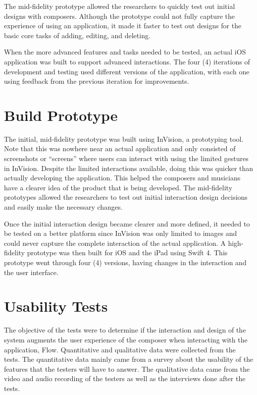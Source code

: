 		The mid-fidelity prototype allowed the researchers to quickly test out initial designs with composers. Although the prototype could not fully capture the experience of using an application, it made it faster to test out designs for the basic core tasks of adding, editing, and deleting. 

		When the more advanced features and tasks needed to be tested, an actual iOS application was built to support advanced interactions. The four (4) iterations of development and testing used different versions of the application, with each one using feedback from the previous iteration for improvements. 

	\section{Build Prototype}

		The initial, mid-fidelity prototype was built using InVision, a prototyping tool. Note that this was nowhere near an actual application and only consisted of screenshots or ``screens'' where users can interact with using the limited gestures in InVision. Despite the limited interactions available, doing this was quicker than actually developing the application. This helped the composers and musicians have a clearer idea of the product that is being developed. The mid-fidelity prototypes allowed the researchers to test out initial interaction design decisions and easily make the necessary changes. 

		Once the initial interaction design became clearer and more defined, it needed to be tested on a better platform since InVision was only limited to images and could never capture the complete interaction of the actual application. A high-fidelity prototype was then built for iOS and the iPad using Swift 4. This prototype went through four (4) versions, having changes in the interaction and the user interface. 

	\section{Usability Tests}

		The objective of the tests were to determine if the interaction and design of the system augments the user experience of the composer when interacting with the application, Flow.  Quantitative and qualitative data were collected from the tests. The quantitative data mainly came from a survey about the usability of the features that the testers will have to answer. The qualitative data came from the video and audio recording of the testers as well as the interviews done after the tests. %

